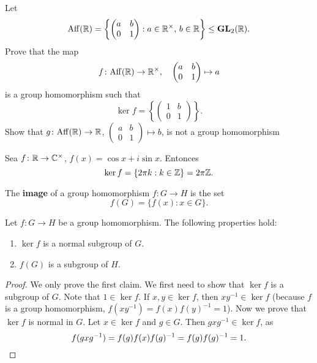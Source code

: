 \begin{exercise}
\label{xca:affine}
Let
\[
\mathrm{Aff}(\mathbb{R})=\left\{\begin{pmatrix}a&b\\0&1\end{pmatrix}:a\in\mathbb{R}^\times,\,b\in\mathbb{R}\right\}\leq\mathbf{GL}_2(\mathbb{R}).
\]
Prove that the map
\[
f\colon \mathrm{Aff}(\mathbb{R})\to\mathbb{R}^\times,\quad
\begin{pmatrix}
a&b\\
0&1
\end{pmatrix}
\mapsto a
\]
is a group homomorphism such that 
\[
\ker f=\left\{\begin{pmatrix}
1&b\\
0&1
\end{pmatrix}
\right\}.
\]
Show that $g\colon\mathrm{Aff}(\mathbb{R})\to\mathbb{R}$, $\begin{pmatrix}a&b\\0&1\end{pmatrix}\mapsto b$,
is not a group homomorphism
\end{exercise}



\begin{example}
Sea $f\colon\mathbb{R}\to\mathbb{C}^\times$, $f(x)=\cos x+i\sin x$. Entonces
\[
\ker f=\{2\pi k:k\in\mathbb{Z}\}=2\pi\mathbb{Z}.
\]
\end{example}

\begin{definition}
The \textbf{image} of a group homomorphism $f\colon G\to H$
is the set 
\[
f(G)=\{f(x):x\in G\}.
\]
\end{definition}

\begin{proposition}
    Let $f\colon G\to H$ be a group homomorphism.
    The following properties hold: 
        \begin{enumerate}
                \item $\ker f$ is a normal subgroup of $G$.
                \item $f(G)$ is a subgroup of $H$.
        \end{enumerate}
\end{proposition}

\begin{proof}
    We only prove the first claim. We first need to show that 
    $\ker f$ is a subgroup of $G$. Note that
    $1\in \ker f$. If $x,y\in\ker f$, then
    $xy^{-1}\in\ker f$ (because $f$ is a group homomorphism, 
    $f(xy^{-1})=f(x)f(y)^{-1}=1$). Now we prove that $\ker f$ is normal in $G$. Let $x\in\ker f$ and $g\in G$. Then $gxg^{-1}\in\ker f$, as 
    \[
    f(gxg^{-1})=f(g)f(x)f(g)^{-1}=f(g)f(g)^{-1}=1.\qedhere
    \]
\end{proof}

